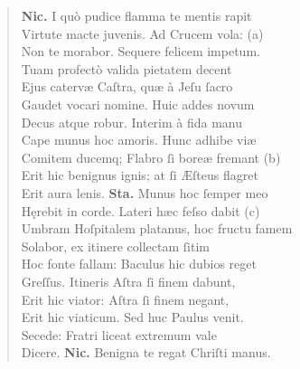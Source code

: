 \documentclass[a4paper,12pt]{article}
\begin{document}
\begin{verse}
\textbf{Nic.} I quò pudice flamma te mentis rapit\\[0pt]
Virtute macte juvenis. Ad Crucem vola: (a)\footnotemark\\[0pt]
Non te morabor. Sequere felicem impetum.\\[0pt]
Tuam profectò valida pietatem decent\\[0pt]
Ejus catervæ Caſtra, quæ à Jeſu ſacro\\[0pt]
Gaudet vocari nomine. Huic addes novum\\[0pt]
Decus atque robur. Interim à fida manu\\[0pt]
Cape munus hoc amoris. Hunc adhibe viæ\\[0pt]
Comitem ducemq; Flabro ſi boreæ fremant (b)\footnotemark\\[0pt]
Erit hic benignus ignis; at ſi Æſteus flagret\\[0pt]
Erit aura lenis. \textbf{Sta.} Munus hoc ſemper meo\\[0pt]
Hęrebit in corde. Lateri hæc feſso dabit (c)\footnotemark\\[0pt]
Umbram Hoſpitalem platanus, hoc fructu famem\\[0pt]
Solabor, ex itinere collectam ſitim\\[0pt]
Hoc fonte fallam: Baculus hic dubios reget\\[0pt]
Greſſus. Itineris Aſtra ſi finem dabunt,\\[0pt]
Erit hic viator: Aſtra ſi finem negant,\\[0pt]
Erit hic viaticum. Sed huc Paulus venit.\\[0pt]
Secede: Fratri liceat extremum vale\\[0pt]
Dicere. \textbf{Nic.} Benigna te regat Chriſti manus.\\[0pt]

\end{verse}
\end{document}
